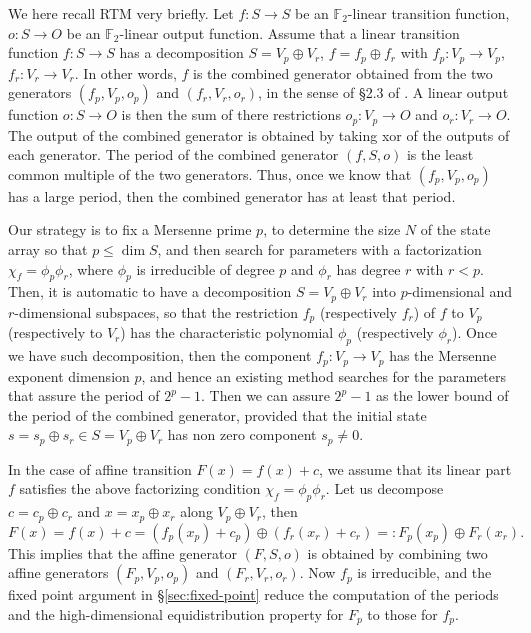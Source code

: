 \documentclass{svmult}
\begin{document}
We here recall RTM very briefly. 
Let $f:S \to S$ be an ${\mathbb F}_2$-linear transition function,
$o:S \to O$ be an ${\mathbb F}_2$-linear output function.
Assume that
a linear transition function $f:S \to S$ has a decomposition
$S=V_p \oplus V_r$, $f=f_p \oplus f_r$ with $f_p:V_p \to V_p$,
$f_r:V_r \to V_r$. In other words, $f$ is the 
combined generator obtained from the two generators 
$(f_p, V_p, o_p)$ and $(f_r, V_r, o_r)$,
in the sense of \S2.3 of \cite{F2RNG-LEcuyer}. A linear output function
$o:S \to O$ is then the sum of there restrictions $o_p:V_p \to O$ and
$o_r:V_r \to O$. The output of the combined generator is obtained by
taking xor of the outputs of each generator.
The period of the combined generator $(f,S,o)$ is the least common multiple 
of the two generators. Thus, once we know that $(f_p,V_p,o_p)$ has a large 
period, then the combined generator has at least that period.

Our strategy is to fix a Mersenne prime $p$, to determine the
size $N$ of the state array so that $p \leq \dim S$, and then
search for parameters with a factorization 
$\chi_f=\phi_p \phi_r$, where $\phi_p$ is irreducible of degree $p$
and $\phi_r$ has degree $r$ with $r<p$. Then, it is automatic to have
a decomposition $S = V_p \oplus V_r$ into $p$-dimensional and 
$r$-dimensional subspaces, so that the restriction
$f_p$ (respectively $f_r$) of $f$ to $V_p$ (respectively to $V_r$)
has the characteristic polynomial $\phi_p$ (respectively $\phi_r$).
Once we have such decomposition, then the component $f_p:V_p \to V_p$ 
has the Mersenne exponent dimension $p$, 
and hence an existing method searches for the parameters that assure 
the period of $2^p-1$. Then we can assure $2^p-1$ as the lower bound of the
period of the combined generator, provided that the initial state 
$s = s_p \oplus s_r \in S = V_p \oplus V_r$ has non zero component 
$s_p \neq 0$.

In the case of affine transition $F(x)=f(x)+c$, we assume 
that its linear part $f$ satisfies the above factorizing condition
$\chi_f=\phi_p\phi_r$. 
Let us decompose $c=c_p\oplus c_r$ and $x=x_p\oplus x_r$
along $V_p\oplus V_r$, then
\begin{equation}\label{eq:decomp-F}
F(x)=f(x)+c=(f_p(x_p)+c_p) \oplus (f_r(x_r)+c_r)=:F_p(x_p)\oplus F_r(x_r).
\end{equation}
This implies that the affine generator $(F, S, o)$ is 
obtained by combining two affine generators 
$(F_p, V_p, o_p)$ and $(F_r, V_r, o_r)$. 
Now $f_p$ is irreducible, and the fixed point argument in 
\S\ref{sec:fixed-point} reduce the computation of the periods
and the high-dimensional equidistribution property for $F_p$
to those for $f_p$.
\end{document}
